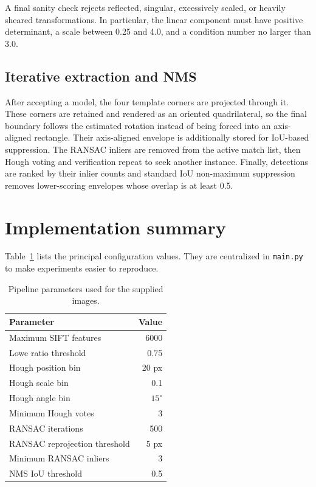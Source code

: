 \documentclass[11pt,a4paper]{article}
\begin{document}
A final sanity check rejects reflected, singular, excessively scaled, or heavily sheared transformations. In particular, the linear component must have positive determinant, a scale between 0.25 and 4.0, and a condition number no larger than 3.0.

\subsection{Iterative extraction and NMS}
After accepting a model, the four template corners are projected through it. These corners are retained and rendered as an oriented quadrilateral, so the final boundary follows the estimated rotation instead of being forced into an axis-aligned rectangle. Their axis-aligned envelope is additionally stored for IoU-based suppression. The RANSAC inliers are removed from the active match list, then Hough voting and verification repeat to seek another instance. Finally, detections are ranked by their inlier counts and standard IoU non-maximum suppression removes lower-scoring envelopes whose overlap is at least 0.5.

\section{Implementation summary}
Table~\ref{tab:parameters} lists the principal configuration values. They are centralized in \texttt{main.py} to make experiments easier to reproduce.

\begin{table}[htbp]
    \centering
    \caption{Pipeline parameters used for the supplied images.}
    \label{tab:parameters}
    \begin{tabular}{lr}
        \toprule
        Parameter & Value \\
        \midrule
        Maximum SIFT features & 6000 \\
        Lowe ratio threshold & 0.75 \\
        Hough position bin & 20 px \\
        Hough scale bin & 0.1 \\
        Hough angle bin & $15^\circ$ \\
        Minimum Hough votes & 3 \\
        RANSAC iterations & 500 \\
        RANSAC reprojection threshold & 5 px \\
        Minimum RANSAC inliers & 3 \\
        NMS IoU threshold & 0.5 \\
        \bottomrule
    \end{tabular}
\end{table}
\end{document}
